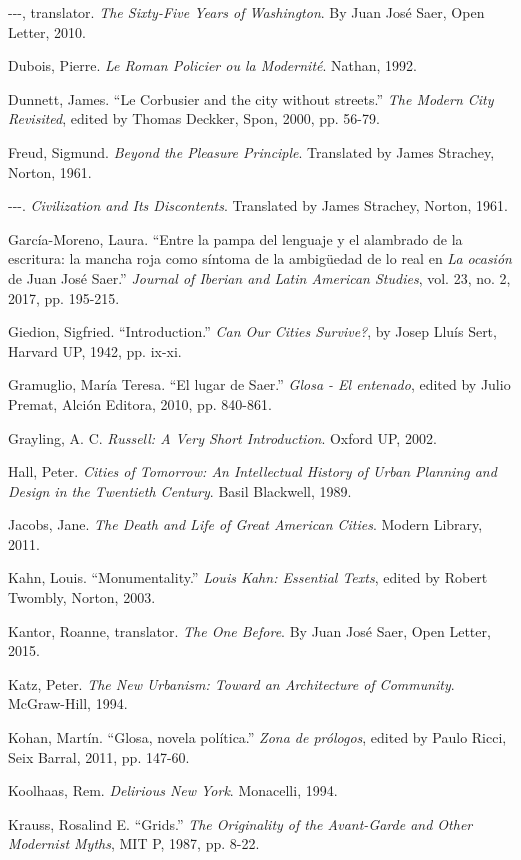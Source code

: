 \documentclass[11pt]{report}
\begin{document}
\begin{hangparas}{.25in}{1}
-{}-{}-, translator. \textit{The Sixty-Five Years of Washington}. By Juan José Saer, Open Letter, 2010.

Dubois, Pierre. \textit{Le Roman Policier ou la Modernité}. Nathan, 1992.

Dunnett, James. ``Le Corbusier and the city without streets.'' \textit{The Modern City Revisited}, edited by Thomas Deckker, Spon, 2000, pp. 56-79.

Freud, Sigmund. \textit{Beyond the Pleasure Principle}. Translated by James Strachey, Norton, 1961.

-{}-{}-. \textit{Civilization and Its Discontents}. Translated by James Strachey, Norton, 1961.

García-Moreno, Laura. ``Entre la pampa del lenguaje y el alambrado de la escritura: la mancha roja como síntoma de la ambigüedad de lo real en \textit{La ocasión} de Juan José Saer.'' \textit{Journal of Iberian and Latin American Studies}, vol. 23, no. 2, 2017, pp. 195-215.

Giedion, Sigfried. ``Introduction.'' \textit{Can Our Cities Survive?}, by Josep Lluís Sert, Harvard UP, 1942, pp. ix-xi.

Gramuglio, María Teresa. ``El lugar de Saer.'' \textit{Glosa - El entenado}, edited by Julio Premat, Alción Editora, 2010, pp. 840-861.

Grayling, A. C. \textit{Russell: A Very Short Introduction}. Oxford UP, 2002.

Hall, Peter. \textit{Cities of Tomorrow: An Intellectual History of Urban Planning and Design in the Twentieth Century}. Basil Blackwell, 1989.

Jacobs, Jane. \textit{The Death and Life of Great American Cities}. Modern Library, 2011.

Kahn, Louis. ``Monumentality.'' \textit{Louis Kahn: Essential Texts}, edited by Robert Twombly, Norton, 2003.

Kantor, Roanne, translator. \textit{The One Before}. By Juan José Saer, Open Letter, 2015.

Katz, Peter. \textit{The New Urbanism: Toward an Architecture of Community}. McGraw-Hill, 1994.

Kohan, Martín. ``Glosa, novela política.'' \textit{Zona de prólogos}, edited by Paulo Ricci, Seix Barral, 2011, pp. 147-60.

Koolhaas, Rem. \textit{Delirious New York}. Monacelli, 1994.

Krauss, Rosalind E. ``Grids.'' \textit{The Originality of the Avant-Garde and Other Modernist Myths}, MIT P, 1987, pp. 8-22.


\end{hangparas}
\end{document}
